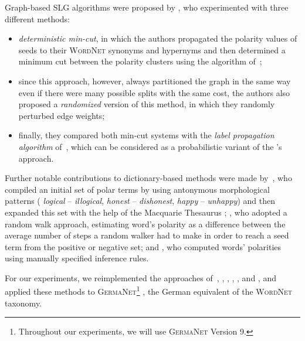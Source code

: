 Graph-based SLG algorithms were proposed by \citet{Rao:09}, who
experimented with three different methods:
\begin{itemize}
\item\emph{deterministic min-cut}, in which the authors propagated the
  polarity values of seeds to their \textsc{WordNet} synonyms and
  hypernyms and then determined a minimum cut between the polarity
  clusters using the algorithm of~\citet{Blum:01};
\item since this approach, however, always partitioned the graph in
  the same way even if there were many possible splits with the same
  cost, the authors also proposed a \emph{randomized} version of this
  method, in which they randomly perturbed edge weights;
\item finally, they compared both min-cut systems with the \emph{label
  propagation algorithm} of~\citet{Zhu:02}, which can be considered as
  a probabilistic variant of the \citeauthor{Blair-Goldensohn:08}'s
  approach.
\end{itemize}

Further notable contributions to dictionary-based methods were made
by~\citet{Mohammad:09}, who compiled an initial set of polar terms by
using antonymous morphological patterns (\eg{} \emph{logical} --
\emph{illogical}, \emph{honest} -- \emph{dishonest}, \emph{happy} --
\emph{unhappy}) and then expanded this set with the help of the
Macquarie Thesaurus \cite{Bernard:86}; \citet{Awadallah:10}, who
adopted a random walk approach, estimating word's polarity as a
difference between the average number of steps a random walker had to
make in order to reach a seed term from the positive or negative set;
and \citet{Dragut:10}, who computed words' polarities using manually
specified inference rules.


For our experiments, we reimplemented the approaches of~\citet{Hu:04},
\citet{Blair-Goldensohn:08}, \citet{Kim:04,Kim:06}, \citet{Esuli:06c},
\citet{Rao:09}, and \citet{Awadallah:10}, and applied these methods to
\textsc{GermaNet}\footnote{Throughout our experiments, we will use
  \textsc{GermaNet} Version 9.} \cite{Hamp:97}, the German equivalent
of the \textsc{WordNet} taxonomy.

